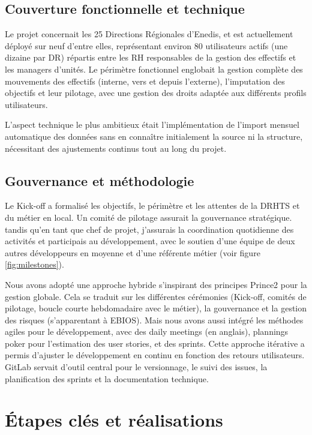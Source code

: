 \subsection{Couverture fonctionnelle et technique}
Le projet concernait les 25 Directions Régionales d'Enedis, et est actuellement déployé sur neuf d'entre elles, représentant environ 80 utilisateurs actifs (une dizaine par DR) répartis entre les RH responsables de la gestion des effectifs et les managers d'unités. Le périmètre fonctionnel englobait la gestion complète des mouvements des effectifs (interne, vers et depuis l'externe), l'imputation des objectifs et leur pilotage, avec une gestion des droits adaptée aux différents profils utilisateurs.

L'aspect technique le plus ambitieux était l'implémentation de l'import mensuel automatique des données sans en connaître initialement la source ni la structure, nécessitant des ajustements continus tout au long du projet.

\subsection{Gouvernance et méthodologie}
Le Kick-off a formalisé les objectifs, le périmètre et les attentes de la DRHTS et du métier en local. Un comité de pilotage assurait la gouvernance stratégique. tandis qu'en tant que chef de projet, j'assurais la coordination quotidienne des activités et participais au développement, avec le soutien d'une équipe de deux autres développeurs en moyenne et d'une référente métier (voir figure \ref{fig:milestones}).

Nous avons adopté une approche hybride s'inspirant des principes Prince2 pour la gestion globale. Cela se traduit sur les différentes cérémonies (Kick-off, comités de pilotage, boucle courte hebdomadaire avec le métier), la gouvernance et la gestion des risques (s'apparentant à EBIOS).
Mais nous avons aussi intégré les méthodes agiles pour le développement, avec des daily meetings (en anglais), plannings poker pour l'estimation des user stories, et des sprints. Cette approche itérative a permis d'ajuster le développement en continu en fonction des retours utilisateurs.
GitLab servait d'outil central pour le versionnage, le suivi des issues, la planification des sprints et la documentation technique.

\section{Étapes clés et réalisations}

